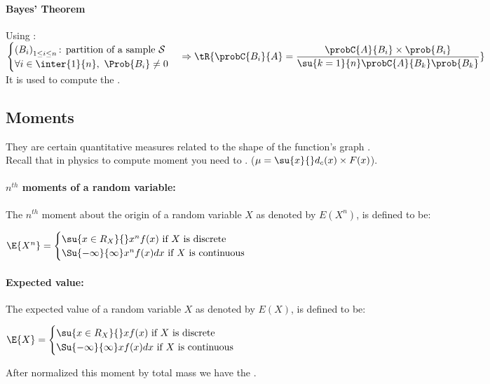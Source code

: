 \paragraph{Bayes' Theorem}
Using :\\
$
\begin{cases}
    \left(B_{i}\right)_{1\leq i\leq n}\text{: partition of a sample }\mathcal{S}\\
    \forall i\in \inter{1}{n},~\Prob{B_{i}} \neq 0
\end{cases} 
\Rightarrow \tR{\probC{B_{i}}{A} = \dfrac{\probC{A}{B_{i}}\times\prob{B_{i}}}{\su{k=1}{n}\probC{A}{B_{k}}\prob{B_{k}}}}
$ \\
It is used to compute the .


\subsection{Moments}
They are certain quantitative measures related to the shape of the function's graph \cite{wiki:moments_mathematics}.\\
Recall that in physics to compute moment you need to .
($\mu=\su{x}{}d_{c}(x)\times F(x)$).

\paragraph{$n^{th}$ moments of a random variable:}
The $n^{th}$ moment about the origin of a random variable $X$ as denoted by
$E\left( X^{n} \right)$, is defined to be:
\begin{center}
	$\E{X^{n}}=
	\begin{cases}
		\su{x\in R_{X}}{{}}x^{n}f(x)\text{ if }X\text{ is discrete}\\
		\Su{-\infty}{\infty}x^{n}f(x)dx\text{ if }X\text{ is continuous}
	\end{cases}$
\end{center}

\paragraph{Expected value:}
The expected value of a random variable $X$ as denoted by
$E\left( X \right)$, is defined to be:
\begin{center}
	$\E{X}=
	\begin{cases}
		\su{x\in R_{X}}{{}}xf(x)\text{ if }X\text{ is discrete}\\
		\Su{-\infty}{\infty}xf(x)dx\text{ if }X\text{ is continuous}
	\end{cases}$
\end{center}
After normalized this moment by total mass we have the .


